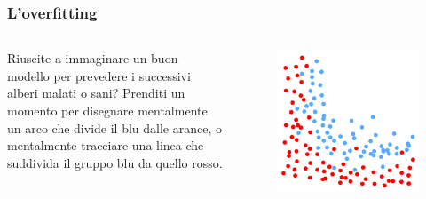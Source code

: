 \begin{frame}

	\frametitle{L'overfitting}

	\begin{columns}
			Riuscite a immaginare un buon modello per prevedere i successivi alberi malati o sani?
			\newlinedouble
			Prenditi un momento per disegnare mentalmente un arco che divide il blu dalle arance, o mentalmente tracciare una linea che suddivida il gruppo blu da quello rosso.

			\begin{figure}[!htbp]
				\centering
				\includegraphics[width=1.0\linewidth]{images/supervised/validation_test_training_peril_of_overfitting/overfitting.pdf}
			\end{figure}

	\end{columns}
\end{frame}


